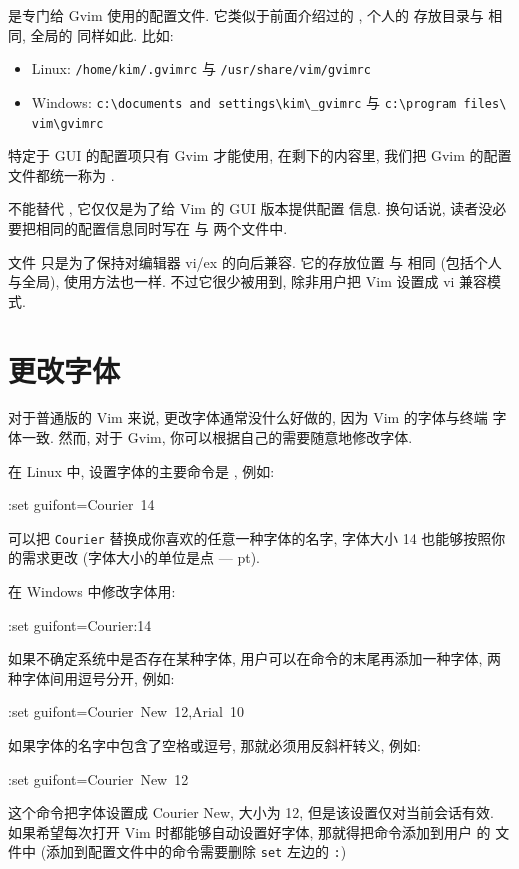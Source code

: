  是专门给 Gvim 使用的配置文件. 它类似于前面介绍过的
, 个人的  存放目录与  相同, 全局的 
同样如此. 比如:
\begin{itemize}
    \item Linux: \texttt{/home/kim/.gvimrc} 与
        \texttt{/usr/share/vim/gvimrc}
    \item Windows: \texttt{c:\textbackslash documents and
        settings\textbackslash kim\textbackslash\_gvimrc}  与
        \texttt{c:\textbackslash program files\textbackslash
        vim\textbackslash gvimrc}
\end{itemize}
\begin{warning}
特定于 GUI 的配置项只有 Gvim 才能使用, 在剩下的内容里, 我们把 Gvim 的配置 
文件都统一称为 .
\end{warning}

 不能替代 , 它仅仅是为了给 Vim 的 GUI 版本提供配置
信息. 换句话说, 读者没必要把相同的配置信息同时写在  与
 两个文件中.

文件  只是为了保持对编辑器 vi/ex 的向后兼容. 它的存放位置
与  相同 (包括个人与全局), 使用方法也一样. 不过它很少被用到,
除非用户把 Vim 设置成 vi 兼容模式.

\section{更改字体}
\label{sec:changing_the_fonts}
对于普通版的 Vim 来说, 更改字体通常没什么好做的, 因为 Vim 的字体与终端
字体一致. 然而, 对于 Gvim, 你可以根据自己的需要随意地修改字体.

在 Linux 中, 设置字体的主要命令是 , 例如:
\begin{vimcmd}
:set guifont=Courier\ 14
\end{vimcmd}
可以把 \texttt{Courier} 替换成你喜欢的任意一种字体的名字, 字体大小 14 
也能够按照你的需求更改 (字体大小的单位是点 --- pt).

在 Windows 中修改字体用:
\begin{vimcmd}
:set guifont=Courier:14
\end{vimcmd}
如果不确定系统中是否存在某种字体, 用户可以在命令的末尾再添加一种字体,
两种字体间用逗号分开, 例如:
\begin{vimcmd}
:set guifont=Courier\ New\ 12,Arial\ 10
\end{vimcmd}
如果字体的名字中包含了空格或逗号, 那就必须用反斜杆转义, 例如:
\begin{vimcmd}
:set guifont=Courier\ New\ 12
\end{vimcmd}
这个命令把字体设置成 Courier New, 大小为 12, 但是该设置仅对当前会话有效.
如果希望每次打开 Vim 时都能够自动设置好字体, 那就得把命令添加到用户
的  文件中 (添加到配置文件中的命令需要删除 \texttt{set}
左边的 \texttt{:})

